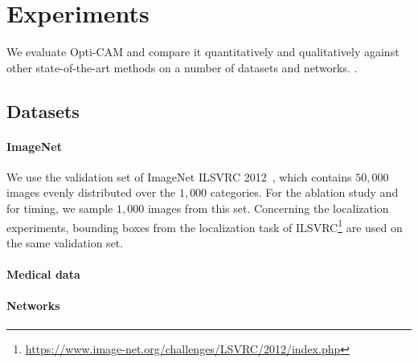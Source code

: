 \section{Experiments}
\label{sec:exp}

We evaluate Opti-CAM and compare it quantitatively and qualitatively against other state-of-the-art methods on a number of datasets and networks. .

\subsection{Datasets}
\label{sec:data}

\paragraph{ImageNet}

We use the validation set of ImageNet ILSVRC 2012~\citep{krizhevsky2012imagenet,ILSVRC15}, which contains $50,000$ images evenly distributed over the $1,000$ categories. For the ablation study and for timing, we sample $1,000$ images from this set. Concerning the localization experiments, bounding boxes from the localization task of ILSVRC\footnote{\url{https://www.image-net.org/challenges/LSVRC/2012/index.php}} are used on the same validation set.

\paragraph{Medical data}



\paragraph{Networks}
\label{sec:setup}

